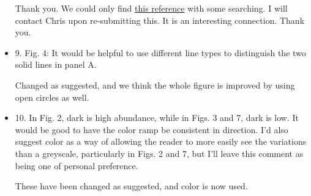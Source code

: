 \documentclass[12pt, titlepage]{article}
\begin{document}
\begin{itemize}
Thank you. We could only find \href{https://groups.google.com/forum/#!topic/r-inla-discussion-group/FniAa8N_KaE}{this reference} with some searching.  I will contact Chris upon re-submitting this.  It is an interesting connection.  Thank you.

\item {\color{red!70!black} 9. Fig. 4: It would be helpful to use different line types to distinguish the two solid lines in panel A.}

  Changed as suggested, and we think the whole figure is improved by using open circles as well.

\item {\color{red!70!black} 10. In Fig. 2, dark is high abundance, while in Figs. 3 and 7, dark is low. It would be good to have the color ramp be consistent in direction. I'd also suggest color as a way of allowing the reader to more easily see the variations than a greyscale, particularly in Figs. 2 and 7, but I'll leave this comment as being one of personal preference.
}

These have been changed as suggested, and color is now used.

\end{itemize}

%
%
\end{document}
